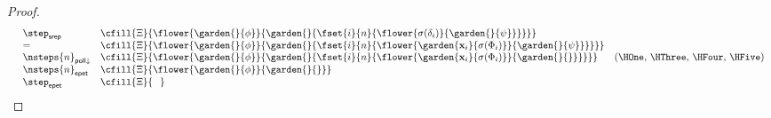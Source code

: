 \begin{proof}
$$\begin{array}{rlll}
    &\step_{\mathsf{srep}} &\cfill{\Xi}{\flower{\garden{{}}{\phi}}{\garden{{}}{\fset{i}{n}{\flower{\sigma(\delta_i)}{\garden{{}}{\psi}}}}}} & \\
    &= &\cfill{\Xi}{\flower{\garden{{}}{\phi}}{\garden{{}}{\fset{i}{n}{\flower{\garden{\mathbf{x}_i}{\sigma(\Phi_i)}}{\garden{{}}{\psi}}}}}} & \\
    &\nsteps{n}_{\mathsf{poll}{\downarrow}} &\cfill{\Xi}{\flower{\garden{{}}{\phi}}{\garden{{}}{\fset{i}{n}{\flower{\garden{\mathbf{x}_i}{\sigma(\Phi_i)}}{\garden{{}}{{}}}}}}} &\text{(\HOne, \HThree, \HFour, \HFive)} \\
    &\nsteps{n}_{\mathsf{epet}} &\cfill{\Xi}{\flower{\garden{{}}{\phi}}{\garden{{}}{{}}}} & \\
    &\step_{\mathsf{epet}} &\cfill{\Xi}{\phantom{\Phi}} &
  \end{array}
  $$
\end{proof}

